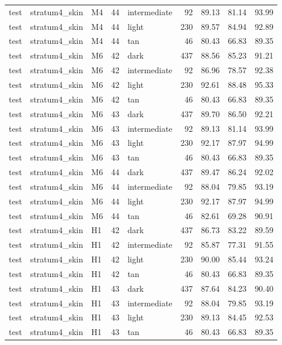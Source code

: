 \begin{tabular}{lllrlrrrr}
test & stratum4\_skin & M4 & 44 & intermediate & 92 & 89.13 & 81.14 & 93.99 \\
test & stratum4\_skin & M4 & 44 & light & 230 & 89.57 & 84.94 & 92.89 \\
test & stratum4\_skin & M4 & 44 & tan & 46 & 80.43 & 66.83 & 89.35 \\
test & stratum4\_skin & M6 & 42 & dark & 437 & 88.56 & 85.23 & 91.21 \\
test & stratum4\_skin & M6 & 42 & intermediate & 92 & 86.96 & 78.57 & 92.38 \\
test & stratum4\_skin & M6 & 42 & light & 230 & 92.61 & 88.48 & 95.33 \\
test & stratum4\_skin & M6 & 42 & tan & 46 & 80.43 & 66.83 & 89.35 \\
test & stratum4\_skin & M6 & 43 & dark & 437 & 89.70 & 86.50 & 92.21 \\
test & stratum4\_skin & M6 & 43 & intermediate & 92 & 89.13 & 81.14 & 93.99 \\
test & stratum4\_skin & M6 & 43 & light & 230 & 92.17 & 87.97 & 94.99 \\
test & stratum4\_skin & M6 & 43 & tan & 46 & 80.43 & 66.83 & 89.35 \\
test & stratum4\_skin & M6 & 44 & dark & 437 & 89.47 & 86.24 & 92.02 \\
test & stratum4\_skin & M6 & 44 & intermediate & 92 & 88.04 & 79.85 & 93.19 \\
test & stratum4\_skin & M6 & 44 & light & 230 & 92.17 & 87.97 & 94.99 \\
test & stratum4\_skin & M6 & 44 & tan & 46 & 82.61 & 69.28 & 90.91 \\
test & stratum4\_skin & H1 & 42 & dark & 437 & 86.73 & 83.22 & 89.59 \\
test & stratum4\_skin & H1 & 42 & intermediate & 92 & 85.87 & 77.31 & 91.55 \\
test & stratum4\_skin & H1 & 42 & light & 230 & 90.00 & 85.44 & 93.24 \\
test & stratum4\_skin & H1 & 42 & tan & 46 & 80.43 & 66.83 & 89.35 \\
test & stratum4\_skin & H1 & 43 & dark & 437 & 87.64 & 84.23 & 90.40 \\
test & stratum4\_skin & H1 & 43 & intermediate & 92 & 88.04 & 79.85 & 93.19 \\
test & stratum4\_skin & H1 & 43 & light & 230 & 89.13 & 84.45 & 92.53 \\
test & stratum4\_skin & H1 & 43 & tan & 46 & 80.43 & 66.83 & 89.35 \\

\end{tabular}
